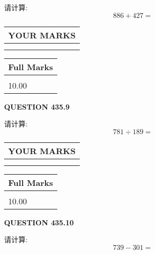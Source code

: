 \documentclass{ctexart}
\begin{document}
  
 
请计算:
\begin{equation}
886 +  %
427 = \nonumber
\end{equation}
 

 

 
  
\vspace{0.2in}
  
\noindent\begin{tabular}{|l|}
\hline
 YOUR MARKS  \\
\hline
 \\ 
 \\ 
\hline
\end{tabular}
\hspace{0.05in} \begin{tabular}{|l|}
\hline
 Full Marks  \\
\hline
 \\ 
10.00 \\
\hline
\end{tabular}
{\textbf{\Large{QUESTION
435.9 
}}}
  
  
 
请计算:
\begin{equation}
781  \div    %
189 = \nonumber
\end{equation}
 

 

 
  
\vspace{0.2in}
  
\noindent\begin{tabular}{|l|}
\hline
 YOUR MARKS  \\
\hline
 \\ 
 \\ 
\hline
\end{tabular}
\hspace{0.05in} \begin{tabular}{|l|}
\hline
 Full Marks  \\
\hline
 \\ 
10.00 \\
\hline
\end{tabular}
{\textbf{\Large{QUESTION
435.10 
}}}
  
  
 
请计算:
\begin{equation}
739 -   %
301 = \nonumber
\end{equation}
 

 

 
   
\end{document}
